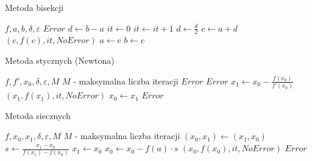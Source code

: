 \documentclass[11pt]{article}
\begin{document}
        \begin{algorithm}
            \caption{Metoda bisekcji}\label{alg:bisection}
            \begin{algorithmic}[1]
                \Require $f, a, b, \delta, \varepsilon$
                    \Return $Error$
                \EndIf
                \State $d \gets b - a$
                \State $it \gets 0$
                    \State $it \gets it + 1$
                    \State $d \gets \frac{d}{2}$
                    \State $c \gets a + d$
                        \Return $(c, f(c), it, NoError)$
                    \EndIf
                        \State $a \gets c$
                    \Else
                        \State $b \gets c$
                    \EndIf
                \EndWhile
            \end{algorithmic}
        \end{algorithm}

        \begin{algorithm}
            \caption{Metoda stycznych (Newtona)}\label{alg:tangend}
            \begin{algorithmic}[1]
                \Require $f, f', x_0, \delta, \varepsilon, M$ 
                    \Comment $M$ - maksymalna liczba iteracji
                    \Return $Error$
                \EndIf
                        \Return $Error$
                    \EndIf
                    \State $x_1 \gets x_0 - \frac{f(x_0)}{f'(x_0)}$
                        \Return $(x_1, f(x_1), it, NoError)$
                    \EndIf
                    \State $x_0 \gets x_1$
                \EndFor
                \State \Return $Error$
            \end{algorithmic}
        \end{algorithm}

        \begin{algorithm}
            \caption{Metoda siecznych}\label{alg:secant}
            \begin{algorithmic}[1]
                \Require $f, x_0, x_1, \delta, \varepsilon, M$ \Comment $M$ - maksymalna liczba iteracji
                        \State $(x_0, x_1) \gets (x_1, x_0)$
                    \EndIf
                    \State $s \gets \frac{x_1 - x_0}{f(x_1) - f(x_0)}$
                    \State $x_1 \gets x_0$
                    \State $x_0 \gets x_0 - f(a) \cdot s$
                        \Return $(x_0, f(x_0), it, NoError)$
                    \EndIf
                \EndFor
                \State \Return $Error$
            \end{algorithmic}
        \end{algorithm}
\end{document}
